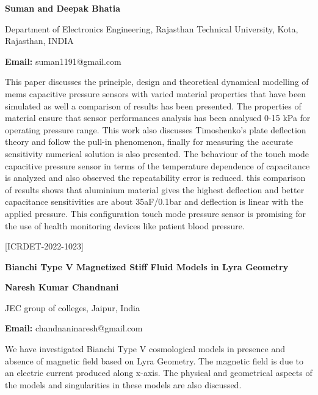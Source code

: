\documentclass[twoside,11pt]{amsart}
\begin{document}
\centerline{\textbf{Suman and Deepak Bhatia}}
\vskip 5mm
\begin{flushleft}
Department of Electronics Engineering, Rajasthan Technical University, Kota, Rajasthan, INDIA
\vskip 5mm
\end{flushleft}
\vskip 2mm
\begin{flushleft}
{\bf Email:} suman1191@gmail.com
\end{flushleft}
\vskip 5mm
This paper discusses the principle, design and theoretical dynamical modelling of mems capacitive pressure sensors with varied material properties that have been simulated as well a comparison of results has been presented. The properties of material ensure that sensor performances analysis has been analysed 0-15 kPa for operating pressure range. This work also discusses Timoshenko’s plate deflection theory and follow the pull-in phenomenon, finally for measuring the accurate sensitivity numerical solution is also presented. The behaviour of the touch mode capacitive pressure sensor in terms of the temperature dependence of capacitance is analyzed and also observed the repeatability error is reduced. this comparison of results shows that aluminium material gives the highest deflection and better capacitance sensitivities are about 35aF/0.1bar and deflection is linear with the applied pressure. This configuration touch mode pressure sensor is promising for the use of health monitoring devices like patient blood pressure.
\vskip 2mm
\newpage
\vskip 5mm
\begin{flushleft}
\centerline{[ICRDET-2022-1023]}
\end{flushleft}
\begin{center}\bf\LARGE
Bianchi Type V Magnetized Stiff Fluid Models in Lyra Geometry



\end{center}
\vskip 5mm

\centerline{\textbf{Naresh Kumar Chandnani}}
\vskip 5mm
\begin{flushleft}
JEC group of colleges, Jaipur, India
\vskip 5mm
\end{flushleft}
\vskip 2mm
\begin{flushleft}
{\bf Email:} chandnaninaresh@gmail.com
\end{flushleft}
\vskip 5mm
We have investigated Bianchi Type V cosmological models in presence
and absence of magnetic field based on Lyra Geometry. The magnetic field is due to an electric
current produced along x-axis. The physical and geometrical aspects of the models and
singularities in these models are also discussed.
\vskip 2mm
\newpage
\end{document}
